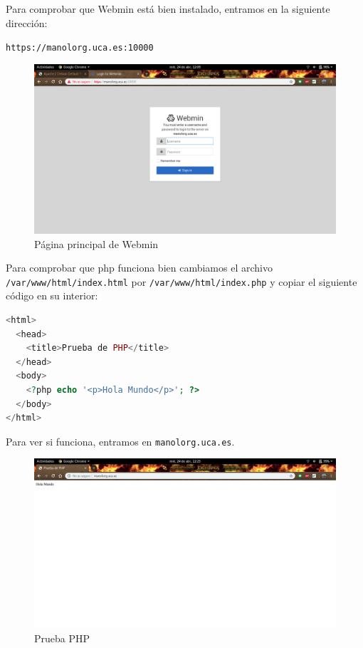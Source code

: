 \documentclass[12pt,letterpaper]{article}
\begin{document}
Para comprobar que Webmin está bien instalado, entramos en la siguiente dirección: 
\begin{center}
	\texttt{https://manolorg.uca.es:10000}
\end{center}
\begin{figure}[h]
	\centering
	\includegraphics[scale=0.34]{Webmin.png}
	\caption{Página principal de Webmin}
	\label{Página principal de Webmin}
\end{figure}

\newpage
Para comprobar que php funciona bien cambiamos el archivo \texttt{/var/www/html/index.html} por \texttt{/var/www/html/index.php} y copiar el siguiente código en su interior:
\begin{lstlisting}[language=PHP]
<html>
  <head>
    <title>Prueba de PHP</title>
  </head>
  <body>
    <?php echo '<p>Hola Mundo</p>'; ?>
  </body>
</html>
\end{lstlisting}

Para ver si funciona, entramos en \texttt{manolorg.uca.es}.
\begin{figure}[h]
	\centering
	\includegraphics[scale=0.34]{PHP.png}
	\caption{Prueba PHP}
	\label{Prueba PHP}
\end{figure}
\end{document}
